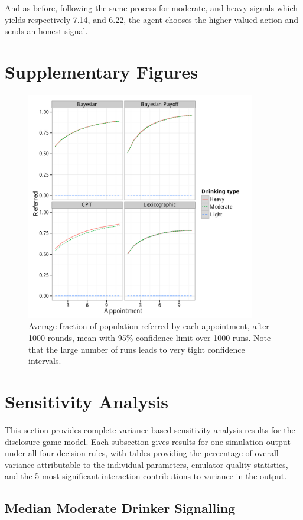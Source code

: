 \documentclass[graybox]{svmult}
\begin{document}
And as before, following the same process for moderate, and heavy signals which yields respectively 7.14, and 6.22, the agent chooses the higher valued action and sends an honest signal. 
\section{Supplementary Figures}
\label{app:additional_figures}

\begin{figure}[H]
\includegraphics[width=100mm]{figures/ref_plot}
\caption{Average fraction of population referred by each appointment, after 1000 rounds, mean with 95\% confidence limit over 1000 runs. Note that the large number of runs leads to very tight confidence intervals.\label{fig:ref_plot}}
\end{figure} \section{Sensitivity Analysis}
\label{app:sensitivity_results}

This section provides complete variance based sensitivity analysis results for the disclosure game model. Each subsection gives results for one simulation output under all four decision rules, with tables providing the percentage of overall variance attributable to the individual parameters, emulator quality statistics, and the 5 most significant interaction contributions to variance in the output.

\subsection{Median Moderate Drinker Signalling}
\end{document}
